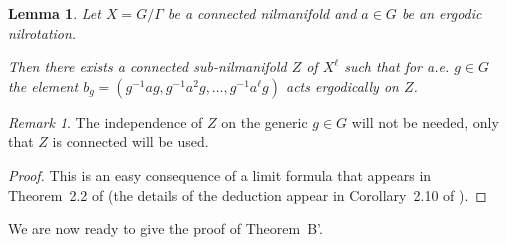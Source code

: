 \documentclass[11pt]{amsart}
\newcommand{\N}{\mathbb{N}}
\theoremstyle{plain}
\newtheorem{lemma}[theorem]{Lemma}
\theoremstyle{definition}
\theoremstyle{remark}
\newtheorem*{remark}{Remark}
\begin{document}
\begin{lemma}\label{L:Ziegler}
Let $X=G/\Gamma$ be a connected nilmanifold and $a\in G$ be an ergodic nilrotation.



Then there exists a connected sub-nilmanifold $Z$ of $X^\ell$ such that for a.e. $g\in G$ the element $b_g=(g^{-1}ag,g^{-1}a^2g,\ldots,g^{-1}a^\ell g)$ acts ergodically on $Z$.
\end{lemma}
\begin{remark}
The independence of $Z$ on the generic $g\in G$ will not be needed, only that $Z$ is connected will be used.
\end{remark}
 \begin{proof}
This is an easy consequence of a limit formula that appears  in Theorem~2.2 of \cite{Z0}
(the details of the deduction appear in Corollary~2.10 of \cite{Fr}).
\end{proof}
We are now ready to give the proof of Theorem~B'.
\end{document}
